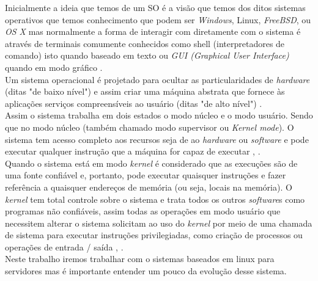 Inicialmente a ideia que temos de um SO é a visão que temos dos ditos sistemas operativos que temos conhecimento que podem ser \emph{Windows}, Linux, \emph{FreeBSD}, ou \emph{OS X} mas normalmente a forma de interagir com diretamente com o sistema é através de terminais comumente conhecidos como shell (interpretadores de comando) isto quando baseado em texto ou \emph{GUI (Graphical User Interface)} quando em modo gráfico \cite{Tanenbaum2016}.\\
Um sistema operacional é projetado para ocultar as particularidades de \emph{hardware} (ditas "de baixo nível") e assim criar uma máquina abstrata que fornece às aplicações serviços compreensíveis ao usuário (ditas "de alto nível") \cite{Comer2012}.\\
Assim o sistema trabalha em dois estados o modo núcleo e o modo usuário. Sendo que no modo núcleo (também chamado modo supervisor ou \emph{Kernel mode}). O sistema tem acesso completo aos recursos seja de ao \emph{hardware} ou \emph{software} e pode executar qualquer instrução que a máquina for capaz de executar \cite{Tanenbaum2016}, \cite{linfo2007}.\\
Quando o sistema está em modo \emph{kernel} é considerado que as execuções são de uma fonte confiável e, portanto, pode executar quaisquer instruções e fazer referência a quaisquer endereços de memória (ou seja, locais na memória). O \emph{kernel} tem total controle sobre o sistema e trata todos os outros \emph{software}s como programas não confiáveis, assim todas as operações em modo usuário que necessitem alterar o sistema solicitam ao uso do \emph{kernel} por meio de uma chamada de sistema  para executar instruções privilegiadas, como criação de processos ou operações de entrada / saída \cite{Tanenbaum2016}, \cite{linfo2007}.\\

Neste trabalho iremos trabalhar com o sistemas baseados em linux para servidores mas é importante entender um pouco da evolução desse sistema.

